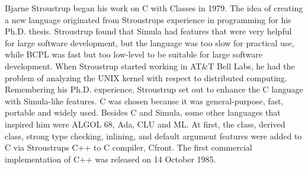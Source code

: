 \noindent Bjarne Stroustrup began his work on C with Classes in 1979. The idea of creating a new language originated from Stroustrups experience in programming for his Ph.D. thesis. Stroustrup found that Simula had features that were very helpful for large software development, but the language was too slow for practical use, while BCPL was fast but too low-level to be suitable for large software development. When Stroustrup started working in AT\&T Bell Labs, he had the problem of analyzing the UNIX kernel with respect to distributed computing. Remembering his Ph.D. experience, Stroustrup set out to enhance the C language with Simula-like features. C was chosen because it was general-purpose, fast, portable and widely used. Besides C and Simula, some other languages
that inspired him were ALGOL 68, Ada, CLU and ML. At first, the class, derived class, strong type checking, inlining, and default argument features were added to C via Stroustrups C++ to C compiler, Cfront. The first commercial implementation of C++ was released on 14 October 1985.

